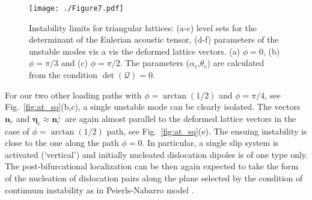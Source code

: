 \documentclass[CRPHYS,Unicode,manuscript]{cedram}
\begin{document}
\begin{figure}[h!]
\centering
\texttt{[image: ./Figure7.pdf]}
\caption{\scriptsize {Instability limits for triangular  lattices: (a-c) level sets for the determinant of the Eulerian acoustic tensor, (d-f) parameters of the unstable modes vis a vis the deformed lattice vectors.
(a) $\phi=0$, (b) $\phi=\pi/3$ and (c) $\phi=\pi/2$. The  parameters  ($\alpha_c$,$\theta_c$) are calculated from the condition $\det(\pmb{\mathcal Q})=0$.}
 \label{fig:at_hex}}
\end{figure}

For our two other loading  paths with  $\phi=\arctan(1/2)$ and  $\phi=\pi/4$, see 
 Fig.~\ref{fig:at_sq}(b,c),  a single unstable mode  can be clearly isolated.  The  vectors  $\pmb{n}_c $ and $ \pmb{\eta}_c\approx\pmb{n}_c^\perp$  are again almost parallel  to the deformed lattice vectors in the case of $\phi=\arctan(1/2)$ path, see Fig.~\ref{fig:at_sq}(e). The  ensuing instability is close to the one along the path  $\phi=0$.
 In particular,   a  single slip system is    activated (`vertical') and initially nucleated dislocation dipoles  is  of one type only. The post-bifurcational localization can be then again expected to  take the form of  the nucleation of dislocation pairs  along the  plane selected by  the condition of continuum instability as in Peierls-Nabarro model \cite{Nabarro2002-js}. 
 
\end{document}
